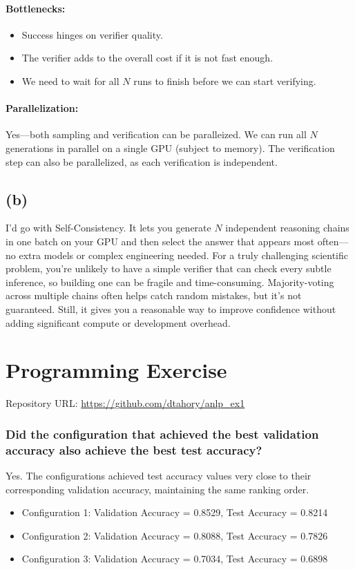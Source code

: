 \documentclass[12pt]{article}
\begin{document}
\paragraph{Bottlenecks:}
\begin{itemize}
    \item Success hinges on verifier quality.
    \item The verifier adds to the overall cost if it is not fast enough.
    \item We need to wait for all $N$ runs to finish before we can start verifying.
\end{itemize}

\paragraph{Parallelization:}
Yes—both sampling and verification can be paralleized. We can run all $N$ generations in parallel on a single GPU (subject to memory). The verification step can also be parallelized, as each verification is independent.


\subsection*{(b)}
I’d go with Self-Consistency. It lets you generate $N$ independent
reasoning chains in one batch on your GPU and then select the
answer that appears most often—no extra models or complex engineering needed.
For a truly challenging scientific problem, you’re unlikely to have
a simple verifier that can check every subtle inference, so building
one can be fragile and time-consuming. Majority-voting across multiple
chains often helps catch random mistakes, but it’s not guaranteed. 
Still, it gives you a reasonable way to improve confidence without
adding significant compute or development overhead.



\pagebreak

\section{Programming Exercise}
Repository URL: \url{https://github.com/dtahory/anlp_ex1}
\subsubsection*{Did the configuration that achieved the best validation accuracy also achieve the best test accuracy?}
Yes. The configurations achieved test accuracy values very close to their corresponding validation accuracy, maintaining the same ranking order.
\begin{itemize}
    \item Configuration 1: Validation Accuracy = 0.8529, Test Accuracy = 0.8214
    \item Configuration 2: Validation Accuracy = 0.8088, Test Accuracy = 0.7826
    \item Configuration 3: Validation Accuracy = 0.7034, Test Accuracy = 0.6898
\end{itemize}
\end{document}
